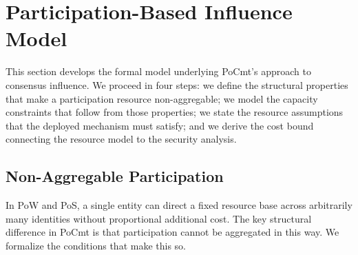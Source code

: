 \documentclass[10pt,journal,twoside]{IEEEtran}
\theoremstyle{remark}
\begin{document}
	\section{Participation-Based Influence Model}
	\label{sec:resource}
	
	This section develops the formal model underlying PoCmt's
	approach to consensus influence.
	We proceed in four steps: we define the structural
	properties that make a participation resource
	non-aggregable; we model the capacity constraints that
	follow from those properties; we state the resource
	assumptions that the deployed mechanism must satisfy;
	and we derive the cost bound connecting the resource
	model to the security analysis.
	
	\subsection{Non-Aggregable Participation}
	\label{ssec:tpi}
	
	In PoW and PoS, a single entity can direct a fixed
	resource base across arbitrarily many identities without
	proportional additional cost.
	The key structural difference in PoCmt is that
	participation cannot be aggregated in this way.
	We formalize the conditions that make this so.
	
\end{document}
